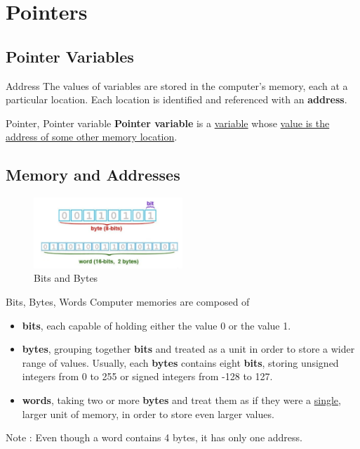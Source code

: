 \chapter{Pointers} %
\label{chap:Pointers}
\section{Pointer Variables} %
\label{sec:Pointer Variables}
\begin{Definition}[colbacktitle=red!75!black]{Address}{}
The values of variables are stored in the computer's memory, each at a particular location. Each location is identified and referenced with an \textbf{address}.
\end{Definition}

\begin{Definition}[colbacktitle=red!75!black]{Pointer, Pointer variable}{}
\textbf{Pointer variable} is a \underline{variable} whose \underline{value is the address of some other memory location}.
\end{Definition}


\section{Memory and Addresses} %
\label{sec:Memory and Addresses}

\begin{figure}[H] %
  \centering
  \includegraphics[width=0.5\textwidth]{./assets/Bits and Bytes.png}
  \caption{Bits and Bytes}
  \label{fig:Bits and Bytes}
\end{figure}

\begin{Definition}[colbacktitle=red!75!black]{Bits, Bytes, Words}{}
Computer memories are composed of 
\begin{itemize}

    \item \textbf{bits}, each capable of holding either the value 0 or the value 1.

    \item \textbf{bytes}, grouping together \textbf{bits} and treated as a unit in order to store a wider range of values. Usually, each \textbf{bytes} contains eight \textbf{bits}, storing unsigned integers from 0 to 255 or signed integers from -128 to 127.

    \item \textbf{words}, taking two or more \textbf{bytes} and treat them as if they were a \underline{single}, larger unit of memory, in order to store even larger values.

\end{itemize}

Note : Even though a word contains 4 bytes, it has only one address.
\end{Definition}


